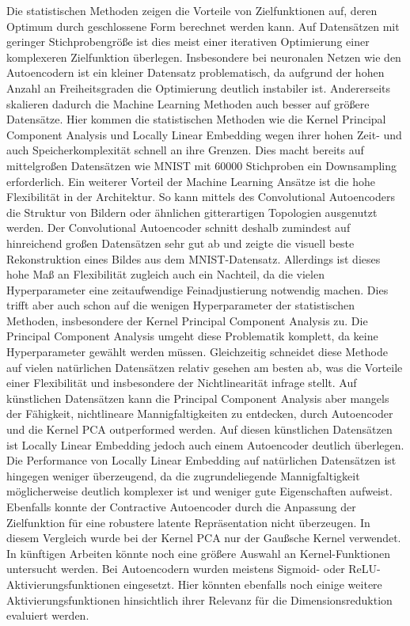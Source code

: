 Die statistischen Methoden zeigen die Vorteile von Zielfunktionen auf, deren Optimum durch
geschlossene Form berechnet werden kann. Auf Datensätzen mit geringer Stichprobengröße ist dies
meist einer iterativen Optimierung einer komplexeren Zielfunktion überlegen. Insbesondere bei
neuronalen Netzen wie den Autoencodern ist ein kleiner Datensatz problematisch, da aufgrund der
hohen Anzahl an Freiheitsgraden die Optimierung deutlich instabiler ist. Andererseits skalieren
dadurch die Machine Learning Methoden auch besser auf größere Datensätze. Hier kommen die
statistischen Methoden wie die Kernel Principal Component Analysis und Locally Linear Embedding
wegen ihrer hohen Zeit- und auch Speicherkomplexität schnell an ihre Grenzen. Dies macht bereits
auf mittelgroßen Datensätzen wie MNIST mit \num{60000} Stichproben ein Downsampling erforderlich.
Ein weiterer Vorteil der Machine Learning Ansätze ist die hohe Flexibilität in der Architektur. So
kann mittels des Convolutional Autoencoders die Struktur von Bildern oder ähnlichen gitterartigen
Topologien ausgenutzt werden. Der Convolutional Autoencoder schnitt deshalb zumindest auf
hinreichend großen Datensätzen sehr gut ab und zeigte die visuell beste Rekonstruktion eines Bildes
aus dem MNIST-Datensatz. Allerdings ist dieses hohe Maß an Flexibilität zugleich auch ein Nachteil,
da die vielen Hyperparameter eine zeitaufwendige Feinadjustierung notwendig machen. Dies trifft
aber auch schon auf die wenigen Hyperparameter der statistischen Methoden, insbesondere der Kernel
Principal Component Analysis zu. Die Principal Component Analysis umgeht diese Problematik
komplett, da keine Hyperparameter gewählt werden müssen. Gleichzeitig schneidet diese Methode auf
vielen natürlichen Datensätzen relativ gesehen am besten ab, was die Vorteile einer Flexibilität
und insbesondere der Nichtlinearität infrage stellt. Auf künstlichen Datensätzen kann die Principal
Component Analysis aber mangels der Fähigkeit, nichtlineare Mannigfaltigkeiten zu entdecken, durch
Autoencoder und die Kernel PCA outperformed werden. Auf diesen künstlichen Datensätzen ist Locally
Linear Embedding jedoch auch einem Autoencoder deutlich überlegen. Die Performance von Locally
Linear Embedding auf natürlichen Datensätzen ist hingegen weniger überzeugend, da die
zugrundeliegende Mannigfaltigkeit möglicherweise deutlich komplexer ist und weniger gute
Eigenschaften aufweist. Ebenfalls konnte der Contractive Autoencoder durch die Anpassung der
Zielfunktion für eine robustere latente Repräsentation nicht überzeugen. In diesem Vergleich wurde
bei der Kernel PCA nur der Gaußsche Kernel verwendet. In künftigen Arbeiten könnte noch eine
größere Auswahl an Kernel-Funktionen untersucht werden. Bei Autoencodern wurden meistens Sigmoid-
oder ReLU-Aktivierungsfunktionen eingesetzt. Hier könnten ebenfalls noch einige weitere
Aktivierungsfunktionen hinsichtlich ihrer Relevanz für die Dimensionsreduktion evaluiert werden.

